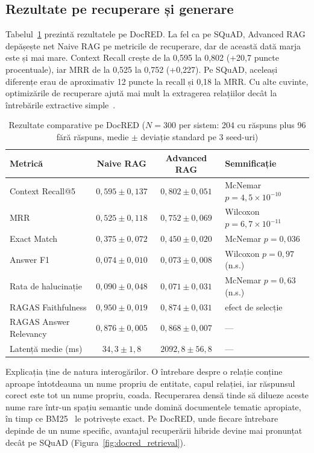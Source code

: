 \subsection{Rezultate pe recuperare și generare}

Tabelul~\ref{tab:docred} prezintă rezultatele pe DocRED. La fel ca pe SQuAD, Advanced RAG depășește net Naive RAG pe metricile de recuperare, dar de această dată marja este și mai mare. Context Recall crește de la 0,595 la 0,802 (+20,7 puncte procentuale), iar MRR de la 0,525 la 0,752 (+0,227). Pe SQuAD, aceleași diferențe erau de aproximativ 12 puncte la recall și 0,18 la MRR. Cu alte cuvinte, optimizările de recuperare ajută mai mult la extragerea relațiilor decât la întrebările extractive simple~\cite{gao2024retrievalaugmentedgenerationlargelanguage}.

\begin{table}[ht]
\centering
\begin{tabular}{lccl}
\toprule
\textbf{Metrică} & \textbf{Naive RAG} & \textbf{Advanced RAG} & \textbf{Semnificație} \\
\midrule
Context Recall@5       & $0{,}595 \pm 0{,}137$ & $0{,}802 \pm 0{,}051$ & McNemar $p = 4{,}5 \times 10^{-10}$ \\
MRR                    & $0{,}525 \pm 0{,}118$ & $0{,}752 \pm 0{,}069$ & Wilcoxon $p = 6{,}7 \times 10^{-11}$ \\
Exact Match            & $0{,}375 \pm 0{,}072$ & $0{,}450 \pm 0{,}020$ & McNemar $p = 0{,}036$ \\
Answer F1              & $0{,}074 \pm 0{,}010$ & $0{,}073 \pm 0{,}008$ & Wilcoxon $p = 0{,}97$ (n.s.) \\
Rata de halucinație    & $0{,}090 \pm 0{,}048$ & $0{,}071 \pm 0{,}031$ & McNemar $p = 0{,}63$ (n.s.) \\
RAGAS Faithfulness     & $0{,}950 \pm 0{,}019$ & $0{,}874 \pm 0{,}031$ & efect de selecție \\
RAGAS Answer Relevancy & $0{,}876 \pm 0{,}005$ & $0{,}868 \pm 0{,}007$ & --- \\
Latență medie (ms)     & $34{,}3  \pm 1{,}8$   & $2092{,}8 \pm 56{,}8$ & --- \\
\bottomrule
\end{tabular}
\caption{Rezultate comparative pe DocRED ($N=300$ per sistem: 204 cu răspuns plus 96 fără răspuns, medie $\pm$ deviație standard pe 3 seed-uri)}
\label{tab:docred}
\end{table}

Explicația ține de natura interogărilor. O întrebare despre o relație conține aproape întotdeauna un nume propriu de entitate, capul relației, iar răspunsul corect este tot un nume propriu, coada. Recuperarea densă tinde să dilueze aceste nume rare într-un spațiu semantic unde domină documentele tematic apropiate, în timp ce BM25~\cite{robertson2009bm25} le potrivește exact. Pe DocRED, unde fiecare întrebare depinde de un nume specific, avantajul recuperării hibride devine mai pronunțat decât pe SQuAD (Figura~\ref{fig:docred_retrieval}).

